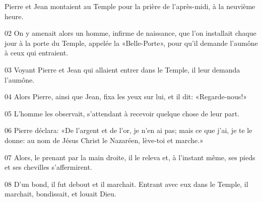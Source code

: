 Pierre et Jean montaient au Temple pour la prière de l’après-midi, à la neuvième heure.

02 On y amenait alors un homme, infirme de naissance, que l’on installait chaque jour à la porte du Temple, appelée la «Belle-Porte», pour qu’il demande l’aumône à ceux qui entraient.

03 Voyant Pierre et Jean qui allaient entrer dans le Temple, il leur demanda l’aumône.

04 Alors Pierre, ainsi que Jean, fixa les yeux sur lui, et il dit: «Regarde-nous!»

05 L’homme les observait, s’attendant à recevoir quelque chose de leur part.

06 Pierre déclara: «De l’argent et de l’or, je n’en ai pas; mais ce que j’ai, je te le donne: au nom de Jésus Christ le Nazaréen, lève-toi et marche.»

07 Alors, le prenant par la main droite, il le releva et, à l’instant même, ses pieds et ses chevilles s’affermirent.

08 D’un bond, il fut debout et il marchait. Entrant avec eux dans le Temple, il marchait, bondissait, et louait Dieu.
